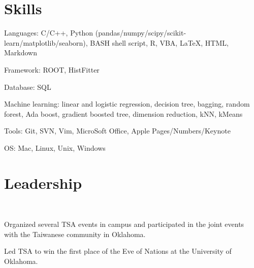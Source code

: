 \documentclass[letterpaper]{deedy-resume-openfont}
\begin{document}

\section{Skills}
\location{}
\begin{tightemize}
\item Languages: C/C++, Python (pandas/numpy/scipy/scikit-learn/matplotlib/seaborn), BASH shell script, R, VBA, \LaTeX, HTML, Markdown
\item Framework: ROOT, HistFitter
\item Database: SQL
\item Machine learning: linear and logistic regression, decision tree, bagging, random forest, Ada boost, gradient boosted tree, dimension reduction, kNN, kMeans
\item Tools: Git, SVN, Vim, MicroSoft Office, Apple Pages/Numbers/Keynote
\item OS: Mac, Linux, Unix, Windows
\end{tightemize}
\sectionsep



\section{Leadership}

\\
\begin{tightemize}
\item Organized several TSA events in campus and participated in the joint events with the Taiwanese community in Oklahoma.
\item Led TSA to win the first place of the Eve of Nations at the University of Oklahoma.
\end{tightemize}
\sectionsep
\end{document}
